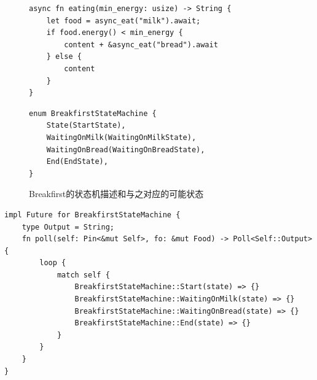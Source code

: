 \begin{figure}[htbp]
    \figureCapSet
	\centering
	\begin{minipage}{0.49\linewidth}%
		\centering
        \begin{lstlisting}[frame=none]
async fn eating(min_energy: usize) -> String {
    let food = async_eat("milk").await;
    if food.energy() < min_energy {
        content + &async_eat("bread").await
    } else {
        content
    }
}
        \end{lstlisting}
	\end{minipage}
    \hfill
	\begin{minipage}{0.49\linewidth}
		\centering
        \begin{lstlisting}[frame=none]
enum BreakfirstStateMachine {
    State(StartState),
    WaitingOnMilk(WaitingOnMilkState),
    WaitingOnBread(WaitingOnBreadState),
    End(EndState),
}
        \end{lstlisting}
	\end{minipage}
    \caption{Breakfirst的状态机描述和与之对应的可能状态}
\end{figure}

\begin{lstlisting}[caption=Breakfirst的状态转换]
impl Future for BreakfirstStateMachine {
    type Output = String;
    fn poll(self: Pin<&mut Self>, fo: &mut Food) -> Poll<Self::Output> {
        loop {
            match self {
                BreakfirstStateMachine::Start(state) => {}
                BreakfirstStateMachine::WaitingOnMilk(state) => {}
                BreakfirstStateMachine::WaitingOnBread(state) => {}
                BreakfirstStateMachine::End(state) => {}
            }
        }
    }
}
\end{lstlisting}
